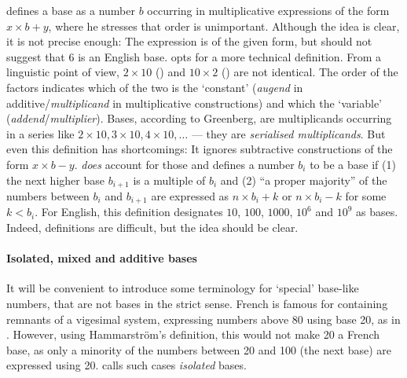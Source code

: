\documentclass{../src/bcthesispart}
\begin{document}
\textcite{Comrie2013} defines a base as a number $b$ occurring in multiplicative expressions of the form $x \times b + y$, where he stresses that order is unimportant.
Although the idea is clear, it is not precise enough:
The expression  is of the given form, but should not suggest that $6$ is an English base. 
\textcite{Greenberg1978} opts for a more technical definition.
From a linguistic point of view, $2\times 10$ () and $10\times 2$ () are not identical.
The order of the factors indicates which of the two is the `constant' (\emph{augend} in additive/\emph{multiplicand} in multiplicative constructions) and which the `variable' (\emph{addend}/\emph{multiplier}). 
Bases, according to Greenberg, are multiplicands occurring in a series like $2 \times 10, 3\times 10, 4\times 10, \dots$ — they are \emph{serialised multiplicands}.
But even this definition has shortcomings: 
It ignores subtractive constructions of the form $x \times b - y$.
\textcite{Hammarstrom2009} \emph{does} account for those and defines a number $b_i$ to be a base if 
(1) the next higher base $b_{i+1}$ is a multiple of $b_i$ and 
(2) “a proper majority” of the numbers between $b_i$ and $b_{i+1}$ are expressed as $n\times b_i + k$ or $n \times b_i - k$ for some $k < b_i$. 
For English, this definition designates $10$, $100$, $1000$, $10^6$ and $10^9$ as bases. 
Indeed, definitions are difficult, but the idea should be clear.




\paragraph{Isolated, mixed and additive bases}

It will be convenient to introduce some terminology for ‘special’ base-like numbers, that are not bases in the strict sense.
French is famous for containing remnants of a vigesimal system, expressing numbers above 80 using base 20, as in .
However, using Hammarström’s definition, this would not make 20 a French base, as only a minority of the numbers between 20 and 100 (the next base) are expressed using 20. 
\textcite{Comrie2011} calls such cases \emph{isolated} bases.
\end{document}
